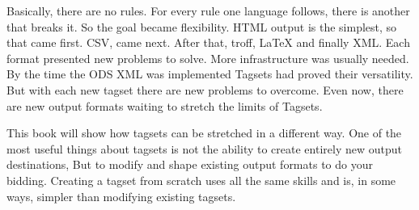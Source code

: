 Basically, there are no rules.  For every rule one language follows, there is another that
breaks it.  So the goal became flexibility.  HTML output is the simplest, so that came first.
CSV, came next.  After that, troff, LaTeX and finally XML.  Each format presented new problems
to solve.  More infrastructure was usually needed.  By the time the ODS XML was implemented
Tagsets had proved their versatility.  But with each new tagset there are new 
problems to overcome.  Even now, there are new output formats waiting to stretch the limits
of Tagsets.  

This book will show how tagsets can be stretched in a different way.  
One of the most useful things about tagsets is not the ability to create entirely new output
destinations, But to modify and shape existing output formats to do your bidding.
Creating a tagset from scratch uses all the same skills and is, in some ways, simpler
than modifying existing tagsets.

